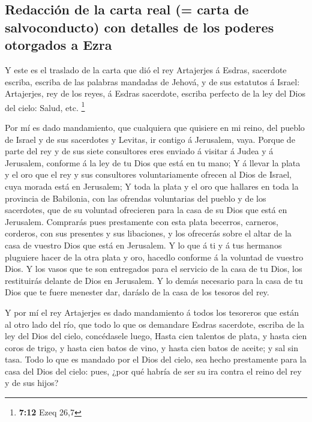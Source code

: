 \hypertarget{redacciuxf3n-de-la-carta-real-carta-de-salvoconducto-con-detalles-de-los-poderes-otorgados-a-ezra}{%
\subsection{Redacción de la carta real (= carta de salvoconducto) con
detalles de los poderes otorgados a
Ezra}\label{redacciuxf3n-de-la-carta-real-carta-de-salvoconducto-con-detalles-de-los-poderes-otorgados-a-ezra}}

 Y este es el traslado de la carta que dió el rey
Artajerjes á Esdras, sacerdote escriba, escriba de las palabras mandadas
de Jehová, y de sus estatutos á Israel:  Artajerjes, rey de
los reyes, á Esdras sacerdote, escriba perfecto de la ley del Dios del
cielo: Salud, etc. \footnote{\textbf{7:12} Ezeq 26,7}

 Por mí es dado mandamiento, que cualquiera que quisiere en
mi reino, del pueblo de Israel y de sus sacerdotes y Levitas, ir contigo
á Jerusalem, vaya.  Porque de parte del rey y de sus siete
consultores eres enviado á visitar á Judea y á Jerusalem, conforme á la
ley de tu Dios que está en tu mano;  Y á llevar la plata y
el oro que el rey y sus consultores voluntariamente ofrecen al Dios de
Israel, cuya morada está en Jerusalem;  Y toda la plata y
el oro que hallares en toda la provincia de Babilonia, con las ofrendas
voluntarias del pueblo y de los sacerdotes, que de su voluntad
ofrecieren para la casa de su Dios que está en Jerusalem. 
Comprarás pues prestamente con esta plata becerros, carneros, corderos,
con sus presentes y sus libaciones, y los ofrecerás sobre el altar de la
casa de vuestro Dios que está en Jerusalem.  Y lo que á ti
y á tus hermanos pluguiere hacer de la otra plata y oro, hacedlo
conforme á la voluntad de vuestro Dios.  Y los vasos que te
son entregados para el servicio de la casa de tu Dios, los restituirás
delante de Dios en Jerusalem.  Y lo demás necesario para la
casa de tu Dios que te fuere menester dar, daráslo de la casa de los
tesoros del rey.

 Y por mí el rey Artajerjes es dado mandamiento á todos los
tesoreros que están al otro lado del río, que todo lo que os demandare
Esdras sacerdote, escriba de la ley del Dios del cielo, concédasele
luego,  Hasta cien talentos de plata, y hasta cien coros de
trigo, y hasta cien batos de vino, y hasta cien batos de aceite; y sal
sin tasa.  Todo lo que es mandado por el Dios del cielo,
sea hecho prestamente para la casa del Dios del cielo: pues, ¿por qué
habría de ser su ira contra el reino del rey y de sus hijos?

